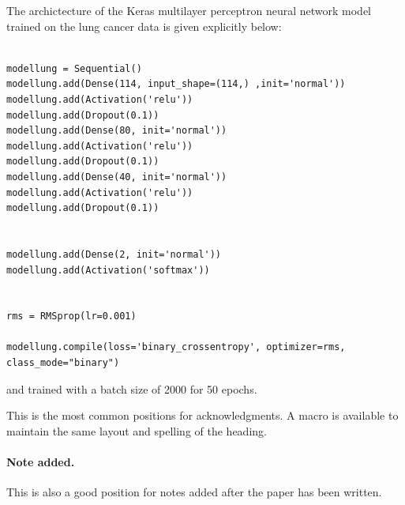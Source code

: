 \documentclass[a4paper,11pt]{article}
\begin{document}
The archictecture of the Keras multilayer perceptron neural network model 
trained on the lung cancer data is given explicitly below:

\begin{verbatim}

modellung = Sequential()
modellung.add(Dense(114, input_shape=(114,) ,init='normal'))
modellung.add(Activation('relu'))
modellung.add(Dropout(0.1))
modellung.add(Dense(80, init='normal'))
modellung.add(Activation('relu'))
modellung.add(Dropout(0.1))
modellung.add(Dense(40, init='normal'))
modellung.add(Activation('relu'))
modellung.add(Dropout(0.1))


modellung.add(Dense(2, init='normal'))
modellung.add(Activation('softmax'))


rms = RMSprop(lr=0.001)

modellung.compile(loss='binary_crossentropy', optimizer=rms, class_mode="binary")

\end{verbatim}

and trained with a batch size of 2000 for 50 epochs.






\acknowledgments

This is the most common positions for acknowledgments. A macro is
available to maintain the same layout and spelling of the heading.

\paragraph{Note added.} This is also a good position for notes added
after the paper has been written.





\end{document}

